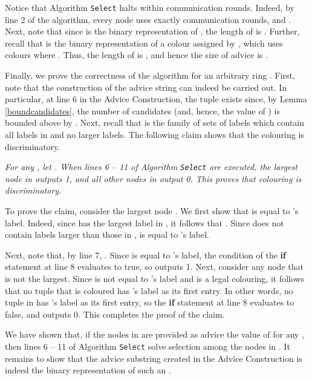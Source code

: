 \documentclass[11pt]{article}
\newcommand{\qed}{\hfill  \bigbreak}
\newenvironment{proof}{\noindent {\bf Proof.}}{\qed}
\begin{document}
\begin{proof}
Notice that Algorithm {\tt Select} halts within   communication rounds. Indeed, 
by line 2 of the algorithm, every node uses exactly  communication rounds, 
and . Next, note that since  is the binary representation of , the length of  is . Further, recall that  is the binary representation of a colour assigned by , which uses  colours where . Thus, the length of  is , and hence the size of advice is  .



Finally, we prove the correctness of the algorithm for an arbitrary ring . First, note that the construction of the advice string can indeed be carried out. In particular, at line 6 in the Advice Construction, the tuple  exists since, by Lemma \ref{boundcandidates}, the number of candidates (and, hence, the value of ) is bounded above by . Next, recall that  is the family of sets  of labels which contain all labels in  and no larger labels. The following claim shows that the colouring  is discriminatory.
 








\vspace{3mm} 
\textit{For any , let . When lines 6 -- 11 of Algorithm {\tt Select} are executed, the largest node in  outputs 1, and all other nodes in  output 0. This proves that colouring  is discriminatory.}
\vspace{3mm}

To prove the claim, consider the largest node . We first show that  is equal to 's label. Indeed, since  has the largest label in , it follows that . Since  does not contain labels larger than those in ,  is equal to 's label.

Next, note that, by line 7, . Since  is equal to 's label, the condition of the \textbf{if} statement at line 8 evaluates to true, so  outputs 1. Next, consider any node  that is not the largest.
Since  is not equal to 's label and  is a legal colouring, it follows that no tuple that is coloured  has 's label as its first entry. In other words, no tuple in  has 's label as its first entry, so the \textbf{if} statement at line 8 evaluates to false, and  outputs 0. This completes the proof of the claim.

We have shown that, if the nodes in  are provided as advice the value of  for any , then lines 6 -- 11 of Algorithm {\tt Select} solve selection among the nodes in . It remains to show that the advice substring  created in the Advice Construction is indeed the binary representation of such an .


\end{proof}
\end{document}
